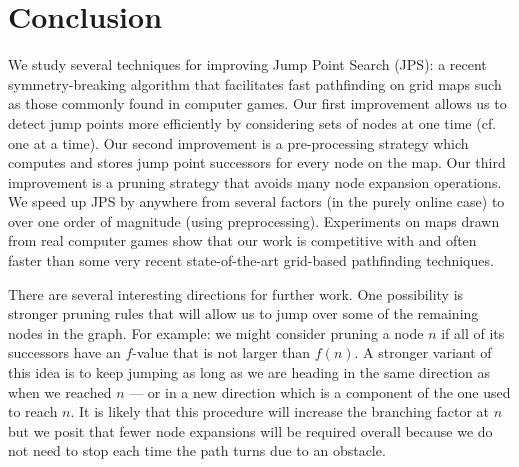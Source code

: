 \section{Conclusion}
\label{sec::conclusion}
We study several techniques for improving Jump Point Search (JPS):
a recent symmetry-breaking algorithm that facilitates fast pathfinding 
on grid maps such as those commonly found in computer games.
Our first improvement allows us to detect jump points 
more efficiently by considering sets of nodes at one time (cf. one at a time). 
Our second improvement is a pre-processing strategy which computes and stores jump point
successors for every node on the map. Our third improvement is a 
pruning strategy that avoids many node expansion operations.
We speed up JPS by anywhere from several factors 
(in the purely online case) to over one order of magnitude (using preprocessing).
Experiments on maps drawn from real computer games show that our 
work is competitive with and often faster than some very recent 
state-of-the-art grid-based pathfinding techniques.
%

There are several interesting directions for further work. One possibility is
stronger pruning rules that will allow us to jump over some of the remaining
nodes in the graph. For example: we might consider %
pruning a node $n$ if all of its successors have
an $f$-value that is not larger than $f(n)$. A stronger variant of this idea
is to keep jumping as long as we are heading in the same direction as when we
reached $n$ --- or in a new direction which is a component of the one used to
reach $n$. It is likely that this procedure will increase the branching factor
at $n$ but we posit that fewer node expansions will be required overall because
we do not need to stop each time the path turns due to an obstacle.

